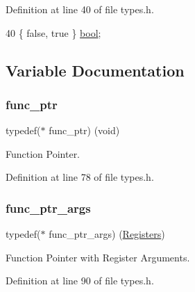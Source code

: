 Definition at line 40 of file types.\+h.


\begin{DoxyCode}
40 \{ \textcolor{keyword}{false}, \textcolor{keyword}{true} \} \hyperlink{a00116_af6a258d8f3ee5206d682d799316314b1_af6a258d8f3ee5206d682d799316314b1}{bool};
\end{DoxyCode}


\subsection{Variable Documentation}
\mbox{\label{a00116_a5e730b1100d491afc6fa17d12fcd15a8_a5e730b1100d491afc6fa17d12fcd15a8}} 
\subsubsection{\texorpdfstring{func\+\_\+ptr}{func\_ptr}}
{\footnotesize\ttfamily typedef($\ast$ func\+\_\+ptr) (void)}



Function Pointer. 



Definition at line 78 of file types.\+h.

\mbox{\label{a00116_a7ec4af7c086c1f2c2a0e01fc23203a56_a7ec4af7c086c1f2c2a0e01fc23203a56}} 
\subsubsection{\texorpdfstring{func\+\_\+ptr\+\_\+args}{func\_ptr\_args}}
{\footnotesize\ttfamily typedef($\ast$ func\+\_\+ptr\+\_\+args) (\hyperlink{a00218}{Registers})}



Function Pointer with Register Arguments. 



Definition at line 90 of file types.\+h.


